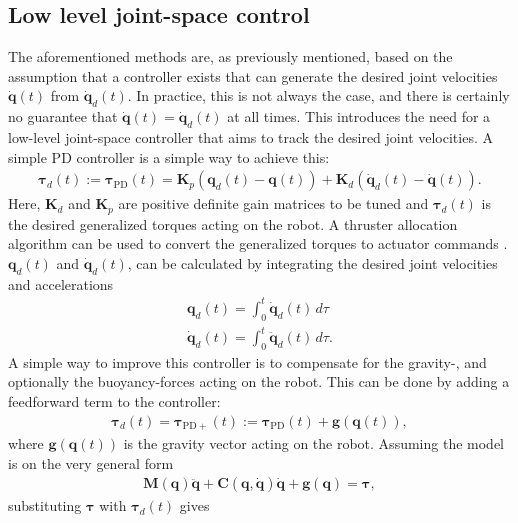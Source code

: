 \subsection{Low level joint-space control}

The aforementioned methods are, as previously mentioned, based on the assumption
that a controller exists that can generate the desired joint velocities $\dot{\bm{q}}(t)$ from $\dot{\bm{q}}_d(t)$.
In practice, this is not always the case, and there is certainly no guarantee that
$\dot{\bm{q}}(t) = \dot{\bm{q}}_d(t)$ at all times. This introduces the need for a
low-level joint-space controller that aims to track the desired joint velocities.
A simple PD controller is a simple way to achieve this:
\begin{align}
    \bm{\tau}_d(t) :=  \bm{\tau}_{\mathrm{PD}}(t) =
        \bm{K}_p \left( \bm{q}_d(t) - \bm{q}(t) \right)
        + \bm{K}_d \left( \dot{\bm{q}}_d(t) - \dot{\bm{q}}(t)\right) \label{eq:Kp_Kd}.
\end{align}
Here, $\bm{K}_d$ and $\bm{K}_p$ are positive definite gain matrices to be tuned
and $\bm{\tau}_d(t)$ is the desired generalized torques acting on the robot. A
thruster allocation algorithm can be used to convert the generalized torques to
actuator commands \cite{fossen2021}. $\bm{q}_d(t)$ and $\dot{\bm{q}}_d(t)$, can be calculated by
integrating the desired joint velocities and accelerations
\begin{subequations}
\begin{align}
    \bm{q}_d(t) = \int_0^t \dot{\bm{q}}_d(t) \, d\tau \\
    \dot{\bm{q}}_d(t) = \int_{0}^t \ddot{\bm{q}}_d(t)\, d\tau.
\end{align}
\end{subequations}
A simple way to improve this controller is to compensate for the gravity-, and
optionally the buoyancy-forces acting on the robot. This can be done by adding
a feedforward term to the controller:
\begin{align}
    \bm{\tau}_d(t) = \bm{\tau}_{\mathrm{PD+}}(t) :=
    \bm{\tau}_{\mathrm{PD}}(t) + \bm{g}(\bm{q}(t)),
\end{align}
where $\bm{g}(\bm{q}(t))$ is the gravity vector acting on the robot. Assuming the
model is on the very general form
\begin{align}
    \bm{M}(\bm{q}) \ddot{\bm{q}} + \bm{C}(\bm{q}, \dot{\bm{q}}) \dot{\bm{q}} + \bm{g}(\bm{q}) = \bm{\tau},
\end{align}
substituting $\bm{\tau}$ with $\bm{\tau}_d(t)$ gives
